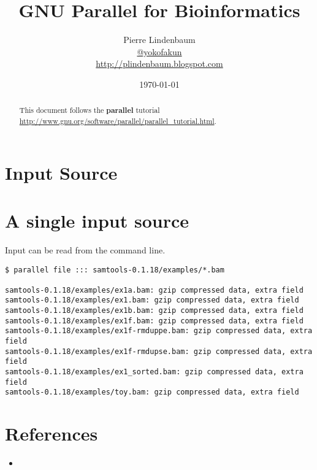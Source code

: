 \documentclass{article}
\date{\today}
\title{GNU Parallel for Bioinformatics}
\author{Pierre Lindenbaum\\\href{https://twitter.com/yokofakun}{@yokofakun}\\\url{http://plindenbaum.blogspot.com} }
\def\prl{\textbf{parallel}}
\begin{document}
\maketitle
\begin{abstract}
This document follows the \prl{} tutorial \url{http://www.gnu.org/software/parallel/parallel_tutorial.html}.
\end{abstract}

\section{Input Source}
\section{A single input source}
Input can be read from the command line.
\begin{lstlisting}
$ parallel file ::: samtools-0.1.18/examples/*.bam

samtools-0.1.18/examples/ex1a.bam: gzip compressed data, extra field
samtools-0.1.18/examples/ex1.bam: gzip compressed data, extra field
samtools-0.1.18/examples/ex1b.bam: gzip compressed data, extra field
samtools-0.1.18/examples/ex1f.bam: gzip compressed data, extra field
samtools-0.1.18/examples/ex1f-rmduppe.bam: gzip compressed data, extra field
samtools-0.1.18/examples/ex1f-rmdupse.bam: gzip compressed data, extra field
samtools-0.1.18/examples/ex1_sorted.bam: gzip compressed data, extra field
samtools-0.1.18/examples/toy.bam: gzip compressed data, extra field
\end{lstlisting}



\section{References}
\begin{itemize}
\item{}
\end{itemize}
\end{document}
